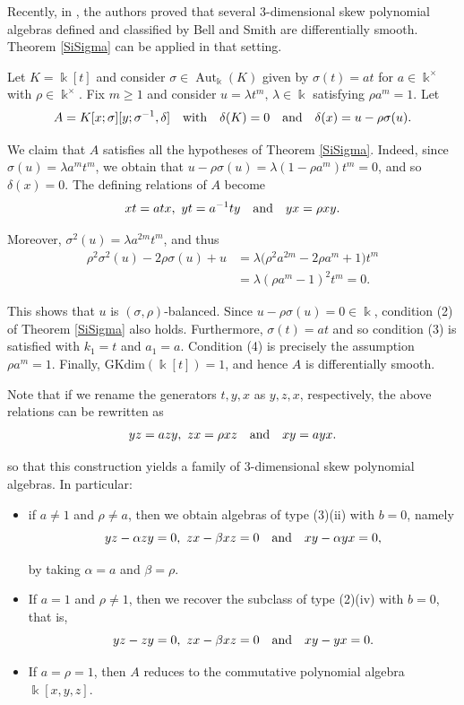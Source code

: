 \documentclass{amsart}
\theoremstyle{definition}
\theoremstyle{remark}
\numberwithin{equation}{section}
\begin{document}
Recently, in \cite[Theorem 3.1]{RubianoReyes20263D}, the authors proved that several $3$-dimensional skew polynomial algebras defined and classified by Bell and Smith \cite{BellSmith1990} are differentially smooth. Theorem \ref{SiSigma} can be applied in that setting.

Let $K=\Bbbk[t]$ and consider $\sigma\in \operatorname{Aut}_{\Bbbk}(K)$ given by $\sigma(t) = at$ for $a\in \Bbbk^\times$ with $\rho\in \Bbbk^\times$. Fix $m\geq 1$ and consider $u=\lambda t^m,
\, \lambda\in \Bbbk$ satisfying $\rho a^m=1$. Let
\[
A=K[x;\sigma][y;\sigma^{-1},\delta] \quad {\rm with} \quad \delta(K)=0 \quad {\rm and} \quad \delta(x)=u-\rho\sigma(u). 
\]

We claim that $A$ satisfies all the hypotheses of Theorem \ref{SiSigma}. Indeed, since $\sigma(u)=\lambda a^m t^m$, we obtain that $u-\rho\sigma(u)
=
\lambda(1-\rho a^m)t^m=0$, and so $\delta(x)=0$. The defining relations of $A$ become
\[
xt=atx,\  yt=a^{-1}ty \quad {\rm and} \quad  yx=\rho xy.
\]

Moreover, $\sigma^2(u)=\lambda a^{2m}t^m$, and thus
\begin{align*}
\rho^2\sigma^2(u)-2\rho\sigma(u)+u & =
\lambda\big(\rho^2a^{2m}-2\rho a^m+1\big)t^m \\ 
& =
\lambda(\rho a^m-1)^2t^m=0.
\end{align*}

This shows that $u$ is $(\sigma,\rho)$-balanced. Since $u-\rho\sigma(u)=0\in \Bbbk$,
condition {\rm(2)} of Theorem \ref{SiSigma} also holds. Furthermore, $\sigma(t)=at$ and so condition {\rm(3)} is satisfied with $k_1=t$ and $a_1=a$. Condition {\rm(4)} is precisely the assumption $\rho a^m=1$. Finally, $\mathrm{GKdim}(\Bbbk[t])=1$, and hence $A$ is differentially smooth.

Note that if we rename the generators $t,y,x$ as $y,z,x$, respectively, the above
relations can be rewritten as
\[
yz=azy,\  zx=\rho xz \quad {\rm and} \quad xy=ayx.
\]

so that this construction yields a family of $3$-dimensional skew polynomial algebras. In particular:
\begin{itemize}
    \item if $a\neq 1$ and $\rho\neq a$, then we obtain algebras of type {\rm(3)(ii)}
    with $b=0$, namely
    \[
    yz - \alpha zy = 0,\  zx - \beta xz = 0 \quad {\rm and} \quad xy - \alpha yx = 0,
    \]
    
    by taking $\alpha = a$ and $\beta = \rho$.
    
    \item If $a=1$ and $\rho\neq 1$, then we recover the subclass of type {\rm(2)(iv)}
    with $b=0$, that is, 
    \[
    yz - zy = 0,\  zx - \beta xz = 0 \quad {\rm and} \quad xy - yx = 0.
    \]
    
    \item If $a=\rho=1$, then $A$ reduces to the commutative polynomial algebra $\Bbbk[x,y,z]$. 
\end{itemize}
\end{document}
